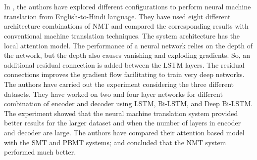 \\\\
In \cite{saini2018neural}, the authors have explored different configurations to perform neural machine translation from English-to-Hindi language. They have used eight different architecture combinations of NMT and compared the corresponding results with conventional machine translation techniques. The system architecture has the local attention model. The performance of a neural network relies on the depth of the network, but the depth also causes vanishing and exploding gradients. So, an additional residual connection is added between the LSTM layers. The residual connections improves the gradient flow facilitating to train very deep networks. The authors have carried out the experiment considering the three different datasets. They have worked on two and four layer networks for different combination of encoder and decoder using LSTM, Bi-LSTM, and Deep Bi-LSTM. The experiment showed that the neural machine translation system provided better results for the larger dataset and when the number of layers in encoder and decoder are large. The authors have compared their attention based model with the SMT and PBMT systems; and concluded that the NMT system performed much better.